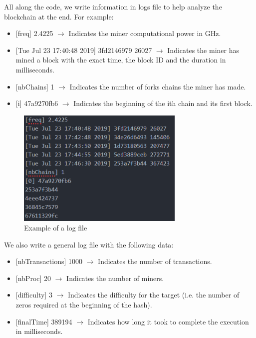 All along the code, we write information in logs file to help analyze the blockchain at the end. For example: \newline

\begin{itemize}
  \item {[freq]} 2.4225  $\rightarrow$ Indicates the miner computational power in GHz.
  \item {[Tue Jul 23 17:40:48 2019]} 3fd2146979 26027 $\rightarrow$ Indicates the miner has mined a block with the exact time, the block ID and the duration in milliseconds.
  \item {[nbChains]} 1 $\rightarrow$ Indicates the number of forks chains the miner has made.
  \item {[i]} 47a9270fb6 $\rightarrow$ Indicates the beginning of the ith chain and its first block.
\end{itemize}
\medskip

\begin{figure}[ht]
\centering
\includegraphics[width=8cm]{Figures/logExample}
\caption{Example of a log file}
\end{figure}
\medskip

We also write a general log file with the following data: \newline

\begin{itemize}
  \item {[nbTransactions]} 1000 $\rightarrow$ Indicates the number of transactions.
  \item {[nbProc]} 20 $\rightarrow$ Indicates the number of miners.
  \item {[difficulty]} 3 $\rightarrow$ Indicates the difficulty for the target (i.e. the number of zeros required at the beginning of the hash).
  \item {[finalTime]} 389194 $\rightarrow$ Indicates how long it took to complete the execution in milliseconds.
\end{itemize}



